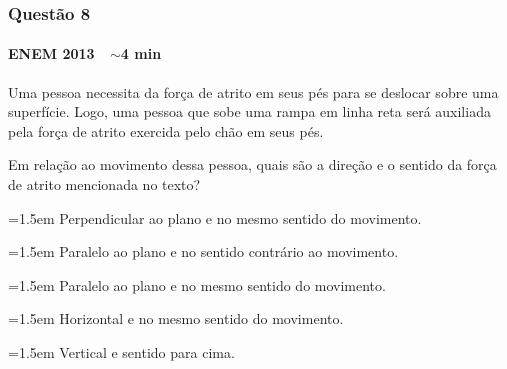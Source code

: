 \documentclass[aspectratio=169,12pt]{beamer}
\newcommand{\optitem}[2]{%
  \par\hangindent=1.5em\hangafter=1
  \makebox[1.5em][l]{\textbf{#1)}}#2}
\newcommand{\alternativas}[5]{%
  \par\vspace{0.55em}%
  \begingroup\setlength{\parskip}{0.30em}%
  \optitem{a}{#1}\optitem{b}{#2}\optitem{c}{#3}\optitem{d}{#4}\optitem{e}{#5}%
  \par\endgroup}
\begin{document}
\begin{frame}
\frametitle{Quest\~ao 8}
\framesubtitle{ENEM 2013 \,\textperiodcentered\, $\sim$4 min}

Uma pessoa necessita da for\c{c}a de atrito em seus p\'es para se
deslocar sobre uma superf\'icie. Logo, uma pessoa que sobe uma rampa em
linha reta ser\'a auxiliada pela for\c{c}a de atrito exercida pelo
ch\~ao em seus p\'es.

\vspace{0.3em}
Em rela\c{c}\~ao ao movimento dessa pessoa, quais s\~ao a
dire\c{c}\~ao e o sentido da for\c{c}a de atrito
mencionada no texto?

\alternativas{Perpendicular ao plano e no mesmo sentido do movimento.}%
{Paralelo ao plano e no sentido contr\'ario ao movimento.}%
{Paralelo ao plano e no mesmo sentido do movimento.}%
{Horizontal e no mesmo sentido do movimento.}%
{Vertical e sentido para cima.}
\end{frame}
\end{document}
